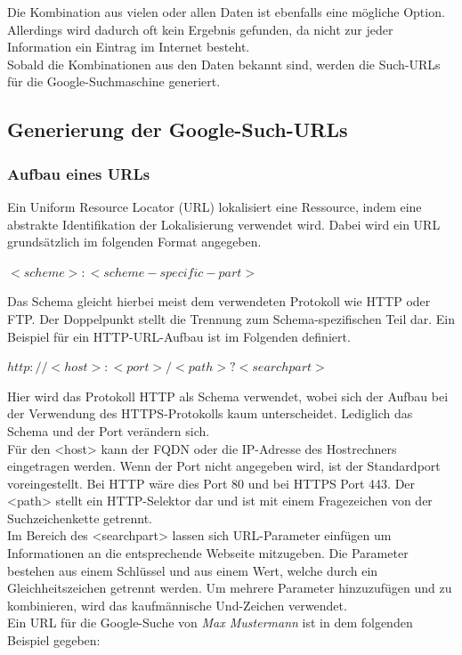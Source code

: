 		
		Die Kombination aus vielen oder allen Daten ist ebenfalls eine mögliche Option. Allerdings wird dadurch oft kein Ergebnis gefunden, da nicht zur jeder Information ein Eintrag im Internet besteht.\\
		Sobald die Kombinationen aus den Daten bekannt sind, werden die Such-URLs für die Google-Suchmaschine generiert.
		\subsection{Generierung der Google-Such-URLs}
			\subsubsection{Aufbau eines URLs}
			\label{subsec:AufbauURL}
			Ein Uniform Resource Locator (URL) lokalisiert eine Ressource, indem eine abstrakte Identifikation der Lokalisierung verwendet wird. Dabei wird ein URL grundsätzlich im folgenden Format angegeben.\cite{RFC1738}
			
			$<scheme>:<scheme-specific-part>$ \cite{RFC1738}
			
			Das Schema gleicht hierbei meist dem verwendeten Protokoll wie HTTP oder FTP. Der Doppelpunkt stellt die Trennung zum Schema-spezifischen Teil dar. Ein Beispiel für ein HTTP-URL-Aufbau ist im Folgenden definiert.\cite{RFC1738}
			
			$http://<host>:<port>/<path>?<searchpart>$\cite{RFC1738}
			
			Hier wird das Protokoll HTTP als Schema verwendet, wobei sich der Aufbau bei der Verwendung des HTTPS-Protokolls kaum unterscheidet. Lediglich das Schema und der Port verändern sich.\\
			Für den <host> kann der FQDN oder die IP-Adresse des Hostrechners eingetragen werden. Wenn der Port nicht angegeben wird, ist der Standardport voreingestellt. Bei HTTP wäre dies Port 80 und bei HTTPS Port 443. Der <path> stellt ein HTTP-Selektor dar und ist mit einem Fragezeichen von der Suchzeichenkette getrennt.\cite{RFC1738}\\ %
			Im Bereich des <searchpart> lassen sich URL-Parameter einfügen um Informationen an die entsprechende Webseite mitzugeben. Die Parameter bestehen aus einem Schlüssel und aus einem Wert, welche durch ein Gleichheitszeichen getrennt werden. Um mehrere Parameter hinzuzufügen und zu kombinieren, wird das kaufmännische Und-Zeichen verwendet.\cite{GoogleURL}\\
			Ein URL für die Google-Suche von \textit{Max Mustermann} ist in dem folgenden Beispiel gegeben:
			
